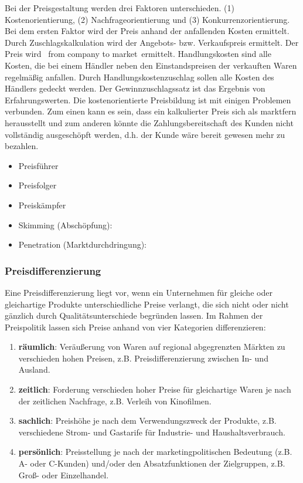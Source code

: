 Bei der Preisgestaltung werden drei Faktoren unterschieden. (1) Kostenorientierung, (2) Nachfrageorientierung und (3) Konkurrenzorientierung. Bei dem ersten Faktor wird der Preis anhand der anfallenden Kosten ermittelt. Durch Zuschlagskalkulation wird der Angebots- bzw. Verkaufspreis ermittelt. Der Preis wird \qr\ from company to market\qr\ ermittelt. Handlungskosten sind alle Kosten, die bei einem Händler neben den Einstandspreisen der verkauften Waren regelmäßig anfallen. Durch Handlungskostenzuschlag sollen alle Kosten des Händlers gedeckt werden. Der Gewinnzuschlagssatz ist das Ergebnis von Erfahrungswerten. Die kostenorientierte Preisbildung ist mit einigen Problemen verbunden. Zum einen kann es sein, dass ein kalkulierter Preis sich als marktfern herausstellt und zum anderen könnte die Zahlungsbereitschaft des Kunden nicht vollständig ausgeschöpft werden, d.h. der Kunde wäre bereit gewesen mehr zu bezahlen.

\begin{itemize}
	\item Preisführer
	\item Preisfolger
	\item Preiskämpfer
\end{itemize}

\begin{itemize}
	\item Skimming (Abschöpfung):
	\item Penetration (Marktdurchdringung):
\end{itemize}

\subsubsection{Preisdifferenzierung}

Eine Preisdifferenzierung liegt vor, wenn ein Unternehmen für gleiche oder gleichartige Produkte unterschiedliche Preise verlangt, die sich nicht oder nicht gänzlich durch Qualitätsunterschiede begründen lassen. Im Rahmen der Preispolitik lassen sich Preise anhand von vier Kategorien differenzieren:

\begin{enumerate}
	\item {\bf räumlich}: Veräußerung von Waren auf regional abgegrenzten Märkten zu verschieden hohen Preisen, z.B. Preisdifferenzierung  zwischen In- und Ausland.
	\item {\bf zeitlich}: Forderung verschieden hoher Preise für gleichartige Waren je nach der zeitlichen Nachfrage, z.B. Verleih von Kinofilmen.
	\item {\bf sachlich}: Preishöhe je nach dem Verwendungszweck der Produkte, z.B. verschiedene Strom- und Gastarife für Industrie- und Haushaltsverbrauch.
	\item {\bf persönlich}: Preisstellung je nach der marketingpolitischen Bedeutung (z.B. A- oder C-Kunden) und/oder den Absatzfunktionen der Zielgruppen, z.B. Groß- oder Einzelhandel.
\end{enumerate}

